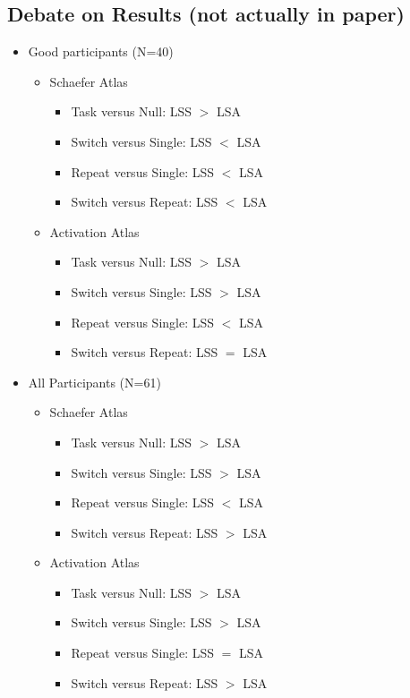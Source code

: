 \documentclass[10pt,letterpaper]{article}
\begin{document}
\subsection*{Debate on Results (not actually in paper)}
\begin{itemize}
  \item Good participants (N=40)
  \begin{itemize} 
    \item Schaefer Atlas
    \begin{itemize}
      \item Task versus Null: LSS $>$ LSA
      \item Switch versus Single: LSS $<$ LSA
      \item Repeat versus Single: LSS $<$ LSA
      \item Switch versus Repeat: LSS $<$ LSA
    \end{itemize}
    \item Activation Atlas
    \begin{itemize}
      \item Task versus Null: LSS $>$ LSA
      \item Switch versus Single: LSS $>$ LSA
      \item Repeat versus Single: LSS $<$ LSA
      \item Switch versus Repeat: LSS $=$ LSA
    \end{itemize}
  \end{itemize}
  \item All Participants (N=61)
  \begin{itemize} 
    \item Schaefer Atlas
    \begin{itemize}
      \item Task versus Null: LSS $>$ LSA
      \item Switch versus Single: LSS $>$ LSA
      \item Repeat versus Single: LSS $<$ LSA
      \item Switch versus Repeat: LSS $>$ LSA
    \end{itemize}
    \item Activation Atlas
    \begin{itemize}
      \item Task versus Null: LSS $>$ LSA
      \item Switch versus Single: LSS $>$ LSA
      \item Repeat versus Single: LSS $=$ LSA
      \item Switch versus Repeat: LSS $>$ LSA
    \end{itemize}
  \end{itemize}
\end{itemize}
\end{document}
